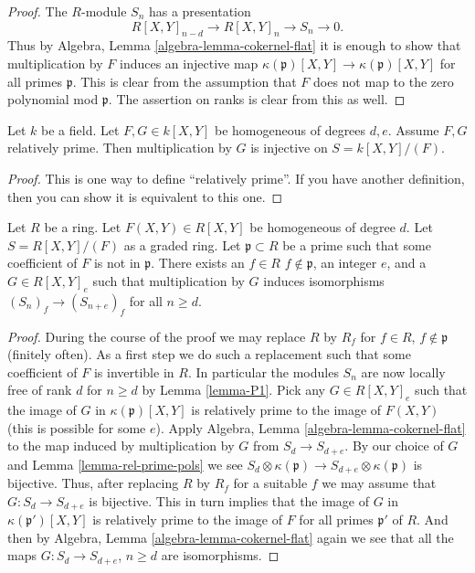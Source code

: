 \begin{proof}
The $R$-module $S_n$ has a presentation
$$
R[X, Y]_{n-d} \to R[X, Y]_n \to S_n \to 0.
$$
Thus by Algebra, Lemma \ref{algebra-lemma-cokernel-flat}
it is enough to show that multiplication
by $F$ induces an injective map
$\kappa(\mathfrak p)[X, Y]
\to \kappa(\mathfrak p)[X, Y]$
for all primes $\mathfrak p$.
This is clear from the assumption that
$F$ does not map to the zero polynomial mod $\mathfrak p$.
The assertion on ranks is clear from this as well.
\end{proof}

\begin{lemma}
\label{lemma-rel-prime-pols}
Let $k$ be a field. Let $F, G \in k[X, Y]$ be homogeneous
of degrees $d, e$. Assume $F, G$ relatively prime.
Then multiplication by $G$ is injective on $S = k[X, Y]/(F)$.
\end{lemma}

\begin{proof}
This is one way to define ``relatively prime''. If you have another
definition, then you can show it is equivalent to this one.
\end{proof}

\begin{lemma}
\label{lemma-P1-localize}
Let $R$ be a ring. Let $F(X, Y) \in R[X, Y]$ be homogeneous of degree
$d$. Let $S = R[X, Y]/(F)$ as a graded ring.
Let $\mathfrak p \subset R$ be a prime such that
some coefficient of $F$ is not in $\mathfrak p$.
There exists an $f \in R$ $f \not\in \mathfrak p$,
an integer $e$, and a $G \in R[X, Y]_e$
such that multiplication by $G$ induces isomorphisms
$(S_n)_f \to (S_{n + e})_f$ for all $n \geq d$.
\end{lemma}

\begin{proof}
During the course of the proof we may replace $R$ by $R_f$
for $f\in R$, $f\not\in \mathfrak p$ (finitely often).
As a first step we do such a replacement such that
some coefficient of $F$ is invertible in $R$.
In particular the modules $S_n$ are now locally
free of rank $d$ for $n \geq d$ by Lemma \ref{lemma-P1}.
Pick any $G \in R[X, Y]_e$ such that the image of
$G$ in $\kappa(\mathfrak p)[X, Y]$ is relatively
prime to the image of $F(X, Y)$ (this is possible for some $e$).
Apply Algebra, Lemma \ref{algebra-lemma-cokernel-flat} to the map
induced by multiplication by $G$ from $S_d \to S_{d + e}$.
By our choice of $G$ and Lemma \ref{lemma-rel-prime-pols}
we see
$S_d \otimes \kappa(\mathfrak p) \to S_{d + e} \otimes \kappa(\mathfrak p)$
is bijective. Thus, after replacing $R$ by $R_f$ for a suitable
$f$ we may assume that $G : S_d \to S_{d + e}$
is bijective. This in turn implies that the image
of $G$ in $\kappa(\mathfrak p')[X, Y]$ is relatively
prime to the image of $F$ for all primes $\mathfrak p'$
of $R$. And then by Algebra, Lemma \ref{algebra-lemma-cokernel-flat}
again we see that all the maps
$G : S_d \to S_{d + e}$, $n \geq d$ are isomorphisms.
\end{proof}

